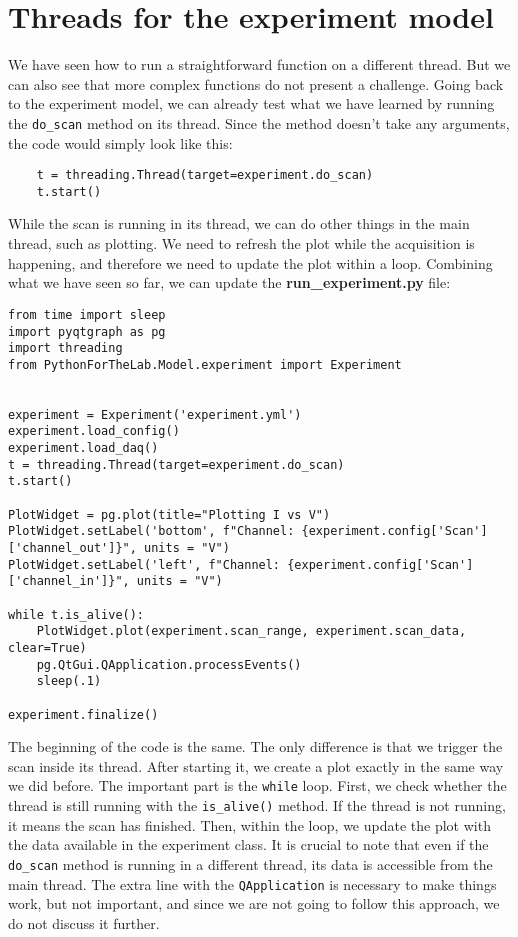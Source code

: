 \section{Threads for the experiment model}\label{sec:threads-experiment-model}
We have seen how to run a straightforward function on a different thread. But we can also see that more complex functions do not present a challenge. Going back to the experiment model, we can already test what we have learned by running the \texttt{do\_scan} method on its thread. Since the method doesn't take any arguments, the code would simply look like this:

\begin{verbatim}
    t = threading.Thread(target=experiment.do_scan)
    t.start()
\end{verbatim}

While the scan is running in its thread, we can do other things in the main thread, such as plotting. We need to refresh the plot while the acquisition is happening, and therefore we need to update the plot within a loop. Combining what we have seen so far, we can update the \textbf{run\_experiment.py} file:

\begin{verbatim}
from time import sleep
import pyqtgraph as pg
import threading
from PythonForTheLab.Model.experiment import Experiment


experiment = Experiment('experiment.yml')
experiment.load_config()
experiment.load_daq()
t = threading.Thread(target=experiment.do_scan)
t.start()

PlotWidget = pg.plot(title="Plotting I vs V")
PlotWidget.setLabel('bottom', f"Channel: {experiment.config['Scan']['channel_out']}", units = "V")
PlotWidget.setLabel('left', f"Channel: {experiment.config['Scan']['channel_in']}", units = "V")

while t.is_alive():
    PlotWidget.plot(experiment.scan_range, experiment.scan_data, clear=True)
    pg.QtGui.QApplication.processEvents()
    sleep(.1)

experiment.finalize()
\end{verbatim}

The beginning of the code is the same. The only difference is that we trigger the scan inside its thread. After starting it, we create a plot exactly in the same way we did before. The important part is the \texttt{while} loop. First, we check whether the thread is still running with the \texttt{is\_alive()} method. If the thread is not running, it means the scan has finished. Then, within the loop, we update the plot with the data available in the experiment class. It is crucial to note that even if the \texttt{do\_scan} method is running in a different thread, its data is accessible from the main thread. The extra line with the \texttt{QApplication} is necessary to make things work, but not important, and since we are not going to follow this approach, we do not discuss it further.

